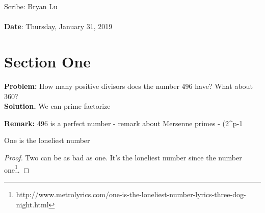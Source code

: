 \documentclass[11pt,twosided]{article}
\def\titlestring{ }
\def\scribestring{Bryan Lu}
\def\datestring{Thursday, January 31, 2019}
\begin{document}
\thispagestyle{plain}  %

\noindent
{\LARGE \textbf{\titlestring}}\\\\
%
{\Large Scribe: \scribestring}\\ \\
{\textbf{Date}: \datestring}


\noindent

\section{Section One}
\textbf{Problem: } How many positive divisors does the number 496 have? What about 360? \\
\textbf{Solution. } We can prime factorize 

\textbf{Remark: } 496 is a perfect number - remark about Mersenne primes - (2^{p-1}
\begin{theorem}
	One is the loneliest number
\end{theorem}
\begin{proof}
	Two can be as bad as one. It's the loneliest number since the number one\footnote{http://www.metrolyrics.com/one-is-the-loneliest-number-lyrics-three-dog-night.html}.
\end{proof}
\end{document}
